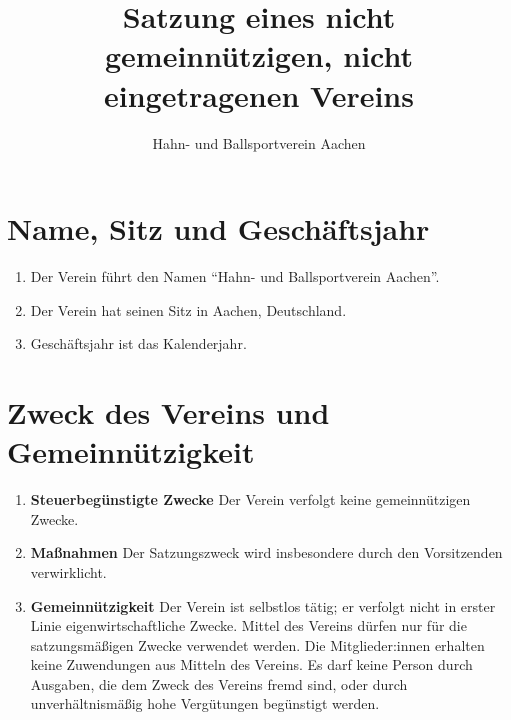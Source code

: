 \documentclass{scrartcl}
\title{Satzung eines nicht gemeinnützigen, nicht eingetragenen Vereins}
\author{Hahn- und Ballsportverein Aachen}
\begin{document}
    \maketitle
    \section{Name, Sitz und Geschäftsjahr}
        \begin{enumerate}
            \item Der Verein führt den Namen ``Hahn- und Ballsportverein Aachen''.
            \item Der Verein hat seinen Sitz in Aachen, Deutschland.
            \item Geschäftsjahr ist das Kalenderjahr.
        \end{enumerate}
    \section{Zweck des Vereins und Gemeinnützigkeit}
        \begin{enumerate}
            \item \textbf{Steuerbegünstigte Zwecke} \newline
                Der Verein verfolgt keine gemeinnützigen Zwecke.
            \item \textbf{Maßnahmen} \newline
                Der Satzungszweck wird insbesondere durch den Vorsitzenden verwirklicht.
            \item \textbf{Gemeinnützigkeit} \newline
                Der Verein ist selbstlos tätig; er verfolgt nicht in erster Linie eigenwirtschaftliche Zwecke. Mittel
                des Vereins dürfen nur für die satzungsmäßigen Zwecke verwendet werden. Die
                Mitglieder:innen erhalten keine Zuwendungen aus Mitteln des Vereins. Es darf keine Person
                durch Ausgaben, die dem Zweck des Vereins fremd sind, oder durch unverhältnismäßig hohe
                Vergütungen begünstigt werden.
        \end{enumerate}
\end{document}
